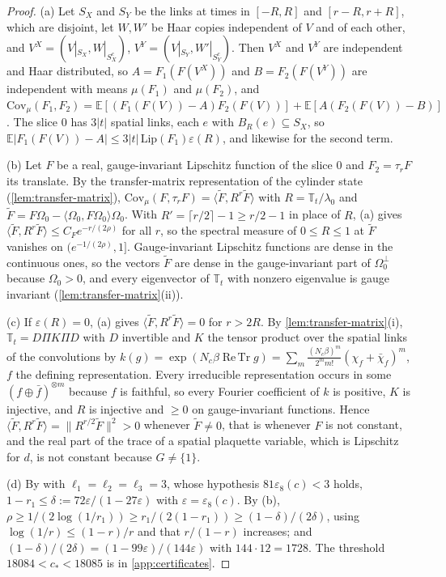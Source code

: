 \documentclass[11pt,a4paper]{amsart}
\theoremstyle{definition}
\theoremstyle{remark}
\numberwithin{equation}{section}
\DeclareMathOperator{\ReTr}{Re\,Tr}  %
\newcommand{\ip}[2]{\langle #1,#2\rangle}  %
\newcommand{\norm}[1]{\lVert #1\rVert}     %
\newcommand{\abs}[1]{\lvert #1\rvert}      %
\newcommand{\TT}{\mathbb{T}}               %
\newcommand{\lzero}{\lambda_0}             %
\newcommand{\Omegazero}{\Omega_0}          %
\begin{document}
\begin{proof}
(a) Let $S_X$ and $S_Y$ be the links at times in $[-R,R]$ and $[r-R,r+R]$, which are disjoint, let $W,W'$ be Haar copies independent of $V$ and of each other, and $V^X=(V|_{S_X},W|_{S_X^c})$, $V^Y=(V|_{S_Y},W'|_{S_Y^c})$. Then $V^X$ and $V^Y$ are independent and Haar distributed, so $A=F_1(F(V^X))$ and $B=F_2(F(V^Y))$ are independent with means $\mu(F_1)$ and $\mu(F_2)$, and $\mathrm{Cov}_\mu(F_1,F_2)=\mathbb E[(F_1(F(V))-A)F_2(F(V))]+\mathbb E[A(F_2(F(V))-B)]$. The slice $0$ has $3\abs t$ spatial links, each $e$ with $B_R(e)\subseteq S_X$, so $\mathbb E\abs{F_1(F(V))-A}\le3\abs t\,\mathrm{Lip}(F_1)\varepsilon(R)$, and likewise for the second term.

(b) Let $F$ be a real, gauge-invariant Lipschitz function of the slice $0$ and $F_2=\tau_rF$ its translate. By the transfer-matrix representation of the cylinder state (\cref{lem:transfer-matrix}), $\mathrm{Cov}_\mu(F,\tau_rF)=\ip{\tilde F}{R^r\tilde F}$ with $R=\TT_t/\lzero$ and $\tilde F=F\Omegazero-\ip{\Omegazero}{F\Omegazero}\Omegazero$. With $R'=\lceil r/2\rceil-1\ge r/2-1$ in place of $R$, (a) gives $\ip{\tilde F}{R^r\tilde F}\le C_Fe^{-r/(2\rho)}$ for all $r$, so the spectral measure of $0\le R\le1$ at $\tilde F$ vanishes on $(e^{-1/(2\rho)},1]$. Gauge-invariant Lipschitz functions are dense in the continuous ones, so the vectors $\tilde F$ are dense in the gauge-invariant part of $\Omegazero^\perp$ because $\Omegazero>0$, and every eigenvector of $\TT_t$ with nonzero eigenvalue is gauge invariant (\cref{lem:transfer-matrix}(ii)).

(c) If $\varepsilon(R)=0$, (a) gives $\ip{\tilde F}{R^r\tilde F}=0$ for $r>2R$. By \cref{lem:transfer-matrix}(i), $\TT_t=D\Pi K\Pi D$ with $D$ invertible and $K$ the tensor product over the spatial links of the convolutions by $k(g)=\exp(N_c\beta\ReTr g)=\sum_m\frac{(N_c\beta)^m}{2^mm!}(\chi_f+\bar\chi_f)^m$, $f$ the defining representation. Every irreducible representation occurs in some $(f\oplus\bar f)^{\otimes m}$ because $f$ is faithful, so every Fourier coefficient of $k$ is positive, $K$ is injective, and $R$ is injective and $\ge0$ on gauge-invariant functions. Hence $\ip{\tilde F}{R^r\tilde F}=\norm{R^{r/2}\tilde F}^2>0$ whenever $\tilde F\ne0$, that is whenever $F$ is not constant, and the real part of the trace of a spatial plaquette variable, which is Lipschitz for $d$, is not constant because $G\ne\{1\}$.

(d) By \cite[Theorem~8]{bhattacharjee2026first} with $\ell_1=\ell_2=\ell_3=3$, whose hypothesis $81\varepsilon_8(c)<3$ holds, $1-r_1\le\delta:=72\varepsilon/(1-27\varepsilon)$ with $\varepsilon=\varepsilon_8(c)$. By (b), $\rho\ge1/(2\log(1/r_1))\ge r_1/(2(1-r_1))\ge(1-\delta)/(2\delta)$, using $\log(1/r)\le(1-r)/r$ and that $r/(1-r)$ increases; and $(1-\delta)/(2\delta)=(1-99\varepsilon)/(144\varepsilon)$ with $144\cdot12=1728$. The threshold $18084<c_*<18085$ is in \cref{app:certificates}.
\end{proof}
\end{document}
